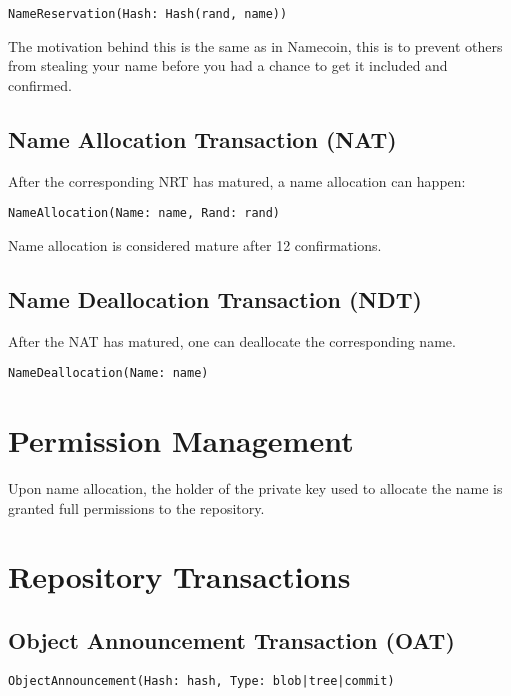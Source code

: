 \documentclass[a4paper]{article}
\begin{document}
\begin{verbatim}
NameReservation(Hash: Hash(rand, name))
\end{verbatim}

The motivation behind this is the same as in Namecoin, this is to prevent others from stealing your name before you had a chance to get it included and confirmed.

\subsection{Name Allocation Transaction (NAT)}

After the corresponding NRT has matured, a name allocation can happen:

\begin{verbatim}
NameAllocation(Name: name, Rand: rand)
\end{verbatim}

Name allocation is considered mature after 12 confirmations.

\subsection{Name Deallocation Transaction (NDT)}

After the NAT has matured, one can deallocate the corresponding name.

\begin{verbatim}
NameDeallocation(Name: name)
\end{verbatim}

\section{Permission Management}

Upon name allocation, the holder of the private key used to allocate the name is granted full permissions to the repository.

\section{Repository Transactions}

\subsection{Object Announcement Transaction (OAT)}

\begin{verbatim}
ObjectAnnouncement(Hash: hash, Type: blob|tree|commit)
\end{verbatim}
\end{document}
